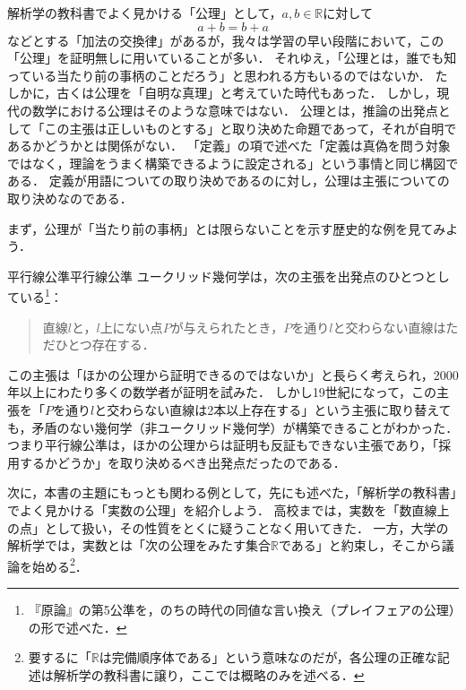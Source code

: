 解析学の教科書でよく見かける「公理」として，$a,b \in \mathbb{R}$に対して
\[
a+b = b+a
\]
などとする「加法の交換律」があるが，我々は学習の早い段階において，この「公理」を証明無しに用いていることが多い．
それゆえ，「公理とは，誰でも知っている当たり前の事柄のことだろう」と思われる方もいるのではないか．
たしかに，古くは公理を「自明な真理」と考えていた時代もあった．
しかし，現代の数学における公理はそのような意味ではない．
公理とは，推論の出発点として「この主張は正しいものとする」と取り決めた命題であって，それが自明であるかどうかとは関係がない．
「定義」の項で述べた「定義は真偽を問う対象ではなく，理論をうまく構築できるように設定される」という事情と同じ構図である．
定義が用語についての取り決めであるのに対し，公理は主張についての取り決めなのである．

まず，公理が「当たり前の事柄」とは限らないことを示す歴史的な例を見てみよう．

\begin{example}{平行線公準}{平行線公準}
  ユークリッド幾何学は，次の主張を出発点のひとつとしている\footnote{『原論』の第5公準を，のちの時代の同値な言い換え（プレイフェアの公理）の形で述べた．}：
  \begin{quote}
    直線$l$と，$l$上にない点$P$が与えられたとき，$P$を通り$l$と交わらない直線はただひとつ存在する．
  \end{quote}
  この主張は「ほかの公理から証明できるのではないか」と長らく考えられ，2000年以上にわたり多くの数学者が証明を試みた．
  しかし19世紀になって，この主張を「$P$を通り$l$と交わらない直線は2本以上存在する」という主張に取り替えても，矛盾のない幾何学（非ユークリッド幾何学）が構築できることがわかった．
  つまり平行線公準は，ほかの公理からは証明も反証もできない主張であり，「採用するかどうか」を取り決めるべき出発点だったのである．
\end{example}

次に，本書の主題にもっとも関わる例として，先にも述べた，「解析学の教科書」でよく見かける「実数の公理」を紹介しよう．
高校までは，実数を「数直線上の点」として扱い，その性質をとくに疑うことなく用いてきた．
一方，大学の解析学では，実数とは「次の公理をみたす集合$\mathbb{R}$である」と約束し，そこから議論を始める\footnote{要するに「$\mathbb{R}$は完備順序体である」という意味なのだが，各公理の正確な記述は解析学の教科書に譲り，ここでは概略のみを述べる．}．

